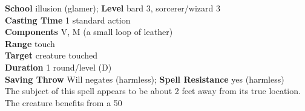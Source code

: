 \textbf{School} illusion (glamer); \textbf{Level} bard 3, sorcerer/wizard 3\\
\textbf{Casting Time} 1 standard action\\
\textbf{Components} V, M (a small loop of leather)\\
\textbf{Range} touch\\
\textbf{Target} creature touched\\
\textbf{Duration} 1 round/level (D)\\
\textbf{Saving Throw }Will negates (harmless); \textbf{Spell Resistance} yes (harmless)\\
The subject of this spell appears to be about 2 feet away from its true location. The creature benefits from a 50%
